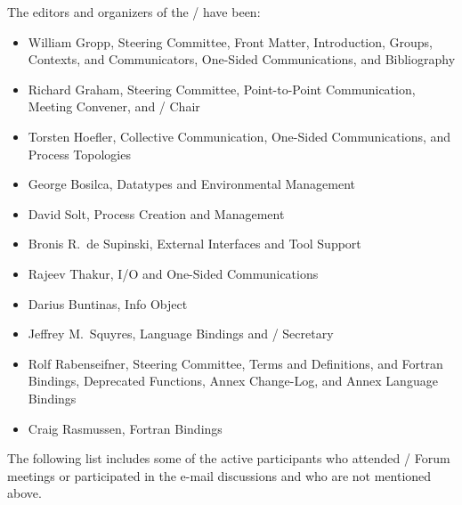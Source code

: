 \noindent The editors and organizers of the \mpiiiidoto/ have been:
\begin{itemize} 
\item William Gropp, Steering Committee, Front Matter, Introduction,
Groups, Contexts, and 
  Communicators, One-Sided Communications, and Bibliography
\item Richard Graham, Steering Committee, Point-to-Point Communication, Meeting
Convener, and \mpiiiidoto/ Chair
\item Torsten Hoefler, Collective Communication, One-Sided
Communications, and Process Topologies  
\item George Bosilca, Datatypes and Environmental Management
\item David Solt, Process Creation and Management
\item Bronis R.~de Supinski, External Interfaces and Tool Support
\item Rajeev Thakur, I/O and One-Sided Communications
\item Darius Buntinas, Info Object
\item Jeffrey M.~Squyres, Language Bindings and \mpiiiidoto/ Secretary
\item Rolf Rabenseifner, Steering Committee, Terms and Definitions, and
  Fortran Bindings,
  Deprecated Functions, Annex Change-Log, and Annex Language Bindings  
\item Craig Rasmussen, Fortran Bindings
\end{itemize} 

The following list includes some of the active participants who
attended \MPIIII/ Forum meetings or participated in the e-mail
discussions and who are not mentioned above. 



